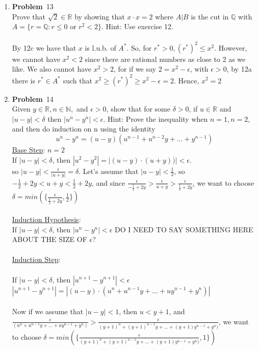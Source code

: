 \documentclass[12pt]{amsart}
\theoremstyle{definition}
\newcommand{\mbR}{\mathbb{R}}
\newcommand{\mbN}{\mathbb{N}}
\newcommand{\mbQ}{\mathbb{Q}}
\newcommand{\itep}{\item {\bfseries Problem}\ }
\begin{document}
\begin{enumerate}[series=p]
\newpage
\itep 13\\
Prove that $\sqrt{2} \in \mbR$ by showing that $x \cdot x = 2$ where $A|B$ is the cut in $\mbQ$ with $A = \{r = \mbQ: r \leq 0 \text{ or } r^2 < 2\}$.  Hint: Use exercise 12.
\\\\
By 12c we have that $x$ is l.u.b. of $A^*$.  So, for $r^* > 0, (r^*)^2 \leq x^2$.  However, we cannot have $x^2 < 2$ since there are rational numbers as close to 2 as we like.  We also cannot have $x^2 > 2$, for if we say $2 = x^2 - \epsilon$, with $\epsilon > 0$, by 12a there is $r^* \in A^*$ such that $x^2 \geq (r^*)^2 \geq x^2 - \epsilon = 2$.  Hence, $x^2 = 2$


\newpage
\itep 14\\
Given $y \in \mbR, n \in \mbN,$ and $\epsilon > 0$, show that for some $\delta > 0$, if $u \in \mbR$ and $|u-y| < \delta$ then $|u^n - y^n| < \epsilon$.  Hint: Prove the inequality when $n = 1, n = 2$, and then do induction on n using the identity
$$u^n - y^n = (u-y)(u^{n-1} + u^{n-2}y + \dots + y^{n-1})$$
\underline{Base Step}: $n = 2$
\\
If $|u - y| < \delta$, then $|u^2 - y^2| = |(u - y) \cdot (u + y))| < \epsilon$.\\ so $|u -y | < \frac{\epsilon}{|u + y|} = \delta$.  Let's assume that $|u - y | < \frac{1}{2}$, so $-\frac{1}{2}+2y < u+y < \frac{1}{2} + 2y$, and since $\frac{\epsilon}{-\frac{1}{2} + 2y} > \frac{\epsilon}{u + y} > \frac{\epsilon}{\frac{1}{2} + 2y}$, we want to choose $\delta = min(\{\frac{\epsilon}{\frac{1}{2}+2y}, \frac{1}{2}\})$
\\\\
\underline{Induction Hypothesis}:
\\
If $|u - y| < \delta$, then $|u^n - y^n| < \epsilon$  DO I NEED TO SAY SOMETHING HERE ABOUT THE SIZE OF $\epsilon$?
\\\\
\underline{Induction Step}:
\\
\\
If $|u-y| < \delta$, then $|u^{n+1} - y^{n+1}| < \epsilon$\\
$|u^{n+1} - y^{n+1}| = |(u - y)\cdot(u^n + u^{n-1}y + \dots + uy^{n-1} + y^n)|$\\
\\
Now if we assume that $|u - y | < 1$, then $u < y + 1$, and $\frac{\epsilon}{(u^n + u^{n-1}y + \dots + uy^{n-1} + y^n)} > \frac{\epsilon}{(y+1)^n + (y+1)^{n-1}y + \dots + (y+1)y^{n-1} + y^n)}$, we want to choose $\delta = min(\{\frac{\epsilon}{(y+1)^n + (y+1)^{n-1}y + \dots + (y+1)y^{n-1} + y^n)}, 1\})$


\end{enumerate}
\end{document}
